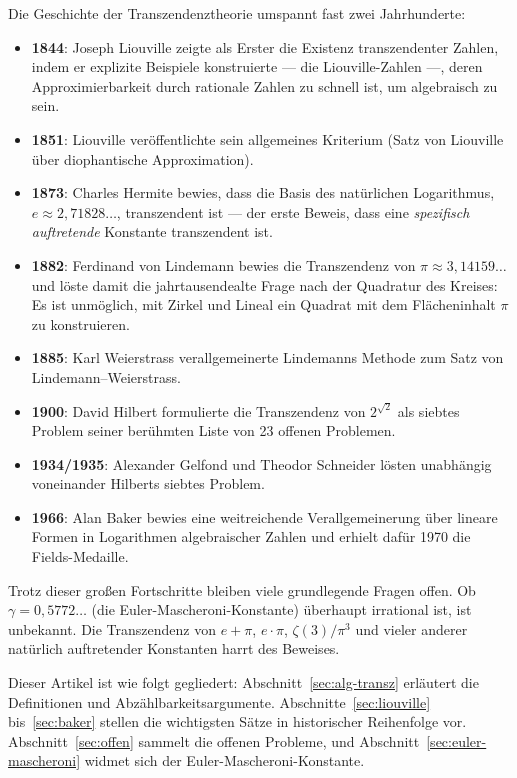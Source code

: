 \documentclass[12pt,a4paper]{amsart}
\theoremstyle{definition}
\begin{document}
Die Geschichte der Transzendenztheorie umspannt fast zwei Jahrhunderte:
\begin{itemize}[leftmargin=2em]
  \item \textbf{1844}: Joseph Liouville zeigte als Erster die Existenz
        transzendenter Zahlen, indem er explizite Beispiele konstruierte ---
        die Liouville-Zahlen ---, deren Approximierbarkeit durch rationale
        Zahlen zu schnell ist, um algebraisch zu sein.
  \item \textbf{1851}: Liouville veröffentlichte sein allgemeines Kriterium
        (Satz von Liouville über diophantische Approximation).
  \item \textbf{1873}: Charles Hermite bewies, dass die Basis des natürlichen
        Logarithmus, $e \approx 2{,}71828\ldots$, transzendent ist --- der
        erste Beweis, dass eine \emph{spezifisch auftretende} Konstante
        transzendent ist.
  \item \textbf{1882}: Ferdinand von Lindemann bewies die Transzendenz von
        $\pi \approx 3{,}14159\ldots$ und löste damit die jahrtausendealte
        Frage nach der Quadratur des Kreises: Es ist unmöglich, mit Zirkel
        und Lineal ein Quadrat mit dem Flächeninhalt $\pi$ zu konstruieren.
  \item \textbf{1885}: Karl Weierstrass verallgemeinerte Lindemanns Methode
        zum Satz von Lindemann--Weierstrass.
  \item \textbf{1900}: David Hilbert formulierte die Transzendenz von
        $2^{\sqrt{2}}$ als siebtes Problem seiner berühmten Liste von 23
        offenen Problemen.
  \item \textbf{1934/1935}: Alexander Gelfond und Theodor Schneider lösten
        unabhängig voneinander Hilberts siebtes Problem.
  \item \textbf{1966}: Alan Baker bewies eine weitreichende Verallgemeinerung
        über lineare Formen in Logarithmen algebraischer Zahlen und erhielt
        dafür 1970 die Fields-Medaille.
\end{itemize}

Trotz dieser großen Fortschritte bleiben viele grundlegende Fragen offen.
Ob $\gamma = 0{,}5772\ldots$ (die Euler-Mascheroni-Konstante) überhaupt
irrational ist, ist unbekannt. Die Transzendenz von $e + \pi$, $e \cdot \pi$,
$\zeta(3)/\pi^3$ und vieler anderer natürlich auftretender Konstanten harrt
des Beweises.

Dieser Artikel ist wie folgt gegliedert: Abschnitt~\ref{sec:alg-transz}
erläutert die Definitionen und Abzählbarkeitsargumente.
Abschnitte~\ref{sec:liouville} bis~\ref{sec:baker} stellen die wichtigsten
Sätze in historischer Reihenfolge vor. Abschnitt~\ref{sec:offen} sammelt die
offenen Probleme, und Abschnitt~\ref{sec:euler-mascheroni} widmet sich der
Euler-Mascheroni-Konstante.
\end{document}
